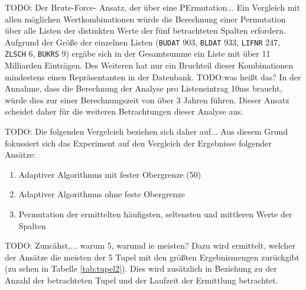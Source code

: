 TODO: Der Brute-Force- Ansatz, der über eine PErmutation...
Ein Vergleich mit allen möglichen Wertkombinationen würde die Berechnung einer Permutation über alle Listen der distinkten Werte der fünf betrachteten Spalten erfordern.
Aufgrund der Größe der einzelnen Listen (\texttt{BUDAT} 903, \texttt{BLDAT} 933, \texttt{LIFNR} 247, \texttt{ZLSCH} 6, \texttt{BUKRS} 9) ergäbe sich in der Gesamtsumme ein Liste mit über 11 Milliarden Einträgen.
Des Weiteren hat nur ein Bruchteil dieser Kombinationen mindestens einen Repräsentanten in der Datenbank.
TODO:was heißt das?
In der Annahme, dass die Berechnung der Analyse pro Listeneintrag 10ms braucht, würde dies zur einer Berechnungszeit von über 3 Jahren führen.
Dieser Ansatz scheidet daher für die weiteren Betrachtungen dieser Analyse aus.

TODO: Die folgenden Vergelcieh beziehen sich daher auf...
Aus diesem Grund fokussiert sich das Experiment auf den Vergleich der Ergebnisse folgender Ansätze:

   \begin{enumerate}
      \item Adaptiver Algorithmus mit fester Obergrenze (50)
      \item Adaptiver Algorithmus ohne feste Obergrenze
			\item Permutation der ermittelten häufigsten, seltensten und mittleren Werte der Spalten
   \end{enumerate}

TODO: Zuncähst,... warum 5, warumd ie meisten?
Dazu wird ermittelt, welcher der Ansätze die meisten der 5 Tupel mit den größten Ergebnismengen zurückgibt (zu sehen in Tabelle \ref{tab:tupel2}).
Dies wird zusätzlich in Beziehung zu der Anzahl der betrachteten Tupel und der Laufzeit der Ermittlung betrachtet.

\begin{table}[h]
	\centering
	\caption{Eingabetupel mit den meisten Ergebnissen}
	\label{tab:tupel2}
\end{table}

